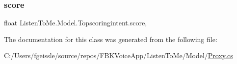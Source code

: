 \mbox{\label{class_listen_to_me_1_1_model_1_1_topscoringintent_abf874e7fa0861cde6292c84eca9dc18b}} 
\subsubsection{\texorpdfstring{score}{score}}
{\footnotesize\ttfamily float Listen\+To\+Me.\+Model.\+Topscoringintent.\+score\hspace{0.3cm}{\ttfamily [get]}, {\ttfamily [set]}}



The documentation for this class was generated from the following file\+:\begin{DoxyCompactItemize}
\item 
C\+:/\+Users/fgeissle/source/repos/\+F\+B\+K\+Voice\+App/\+Listen\+To\+Me/\+Model/\mbox{\hyperlink{_proxy_8cs}{Proxy.\+cs}}\end{DoxyCompactItemize}
